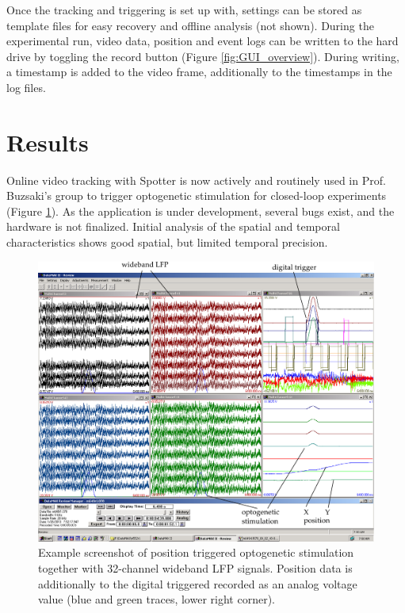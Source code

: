 Once the tracking and triggering is set up with, settings can be stored as template files for easy recovery and offline analysis (not shown). During the experimental run, video data, position and event logs can be written to the hard drive by toggling the record button (Figure \ref{fig:GUI_overview}). During writing, a timestamp is added to the video frame, additionally to the timestamps in the log files. 

\newpage

\section{Results}
\label{sec:results}

Online video tracking with Spotter is now actively and routinely used in Prof. Buzsaki's group to trigger optogenetic stimulation for closed-loop experiments (Figure \ref{fig:dmax}). As the application is under development, several bugs exist, and the hardware is not finalized. Initial analysis of the spatial and temporal characteristics shows good spatial, but limited temporal precision.%

\begin{figure}%
	\centering
		\includegraphics [width=\linewidth]{gfx/dmax_example.pdf} %
	\caption[Test]{Example screenshot of position triggered optogenetic stimulation together with 32-channel wideband LFP signals. Position data is additionally to the digital triggered recorded as an analog voltage value (blue and green traces, lower right corner).}
	\label{fig:dmax}
\end{figure}


